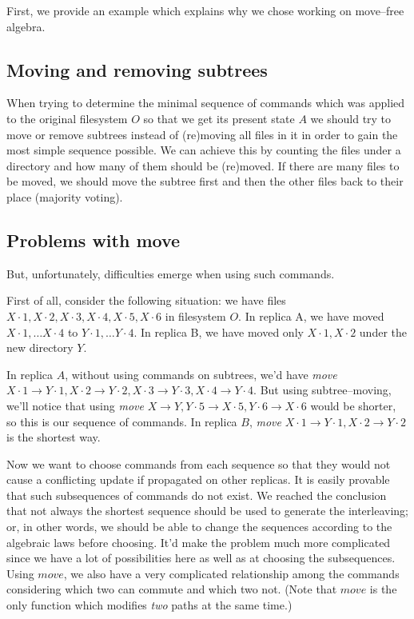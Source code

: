 First, we provide an example which explains why we chose working on
move--free algebra.

\subsection{Moving and removing subtrees}

When trying to determine the minimal sequence of commands which was
applied to the original filesystem \(O\) so that we get its present state
\(A\) we should try to move
or remove subtrees instead of (re)moving all files in it
in order to gain the most simple sequence possible.
We can achieve
this by counting the files under a directory and how many of
them should be (re)moved. If there are many files to be moved, we should
move the subtree first and then the other files back to their place
(majority voting).

\subsection{Problems with move}

But, unfortunately, difficulties emerge when using such commands.

First of all, consider the following situation: we have files \(X\cdot1,
X\cdot2, X\cdot3, X\cdot4, X\cdot5, X\cdot6\) in filesystem \(O\). In
replica A, we have moved \(X\cdot1, \ldots X\cdot4\) to \(Y\cdot1, \ldots
Y\cdot4\). In replica B, we have moved only \(X\cdot1, X\cdot2\) under
the new directory \(Y\).

In replica \(A\), without using commands on subtrees, we'd
have \emph{move} \(X\cdot1\to Y\cdot1, X\cdot2\to Y\cdot2,
X\cdot3\to Y\cdot3, X\cdot4\to Y\cdot4\). But using subtree--moving,
we'll
notice that using \emph{move} \(X\to Y, Y\cdot5\to X\cdot5,
Y\cdot6\to X\cdot6\) would be shorter, so this is our sequence of
commands. In replica \(B\), \emph{move}
\(X\cdot1\to Y\cdot1, X\cdot2\to Y\cdot2\) is the shortest way.

Now we want to choose commands from each sequence so that they would not
cause a conflicting update if propagated on other replicas.
It is easily provable that such subsequences of commands
do not exist. 
We reached the conclusion that not always the
shortest sequence should be used to generate the interleaving; or, in
other words, we should be able to change the sequences according to the
algebraic laws before choosing. It'd make the problem much more
complicated since we have a lot of possibilities here as well as at
choosing the subsequences.  Using \(move\), we also have a very 
complicated relationship among the commands considering which two can
commute and which two not. (Note that \(move\) is the only function
which modifies \emph{two} paths at the same time.)

